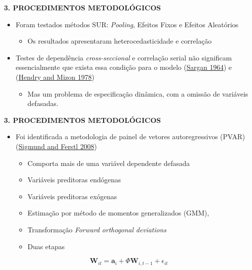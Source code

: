 \documentclass[
  ignorenonframetext,
  aspectratio=169,
  ignorenonframetext]{beamer}
\providecommand{\tightlist}{%
  \setlength{\itemsep}{0pt}\setlength{\parskip}{0pt}}
\begin{document}
\begin{frame}{\textbf{3. PROCEDIMENTOS METODOLÓGICOS}}
\protect\hypertarget{procedimentos-metodoluxf3gicos-5}{}
\begin{itemize}
\tightlist
\item
  Foram testados métodos SUR: \emph{Pooling}, Efeitos Fixos e Efeitos
  Aleatórios

  \begin{itemize}
  \tightlist
  \item
    Os resultados apresentaram heterocedasticidade e correlação
  \end{itemize}
\item
  Testes de dependência \emph{cross-seccional} e correlação serial não
  significam essencialmente que exista essa condição para o modelo
  (\protect\hyperlink{ref-sargan:1964}{Sargan 1964}) e
  (\protect\hyperlink{ref-hendry:1978}{Hendry and Mizon 1978})

  \begin{itemize}
  \tightlist
  \item
    Mas um problema de especificação dinâmica, com a omissão de
    variáveis defasadas.
  \end{itemize}
\end{itemize}
\end{frame}

\begin{frame}{\textbf{3. PROCEDIMENTOS METODOLÓGICOS}}
\protect\hypertarget{procedimentos-metodoluxf3gicos-6}{}
\begin{itemize}
\tightlist
\item
  Foi identificada a metodologia de painel de vetores autoregressivos
  (PVAR) (\protect\hyperlink{ref-sigmund:2008}{Sigmund and Ferstl 2008})

  \begin{itemize}
  \tightlist
  \item
    Comporta mais de uma variável dependente defasada
  \item
    Variáveis preditoras endógenas
  \item
    Variáveis preditoras exógenas
  \item
    Estimação por método de momentos generalizados (GMM),
  \item
    Transformação \emph{Forward orthogonal deviations}
  \item
    Duas etapas
  \end{itemize}
\end{itemize}

\begin{equation}\label{eq:pvar}
\mathbf{W}_{it} = \mathbf{a}_{i} + \Phi \mathbf{W}_{i, t-1} + \epsilon_{it}  
\end{equation}
\end{frame}
\end{document}
